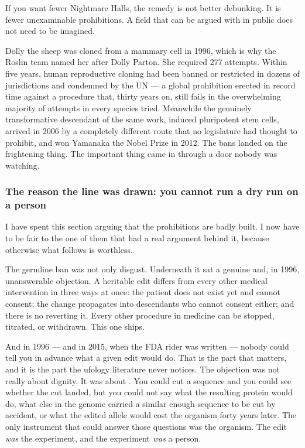 If you want fewer Nightmare Halls, the remedy is not better debunking. It is fewer unexaminable
prohibitions. A field that can be argued with in public does not need to be imagined.

\begin{funfact}
Dolly the sheep was cloned from a mammary cell in 1996, which is why the Roslin team named her
after Dolly Parton. She required 277 attempts. Within five years, human reproductive cloning had
been banned or restricted in dozens of jurisdictions and condemned by the UN --- a global
prohibition erected in record time against a procedure that, thirty years on, still fails in the
overwhelming majority of attempts in every species tried. Meanwhile the genuinely transformative
descendant of the same work, induced pluripotent stem cells, arrived in 2006 by a completely
different route that no legislature had thought to prohibit, and won Yamanaka the Nobel Prize in
2012. The bans landed on the frightening thing. The important thing came in through a door nobody
was watching.
\end{funfact}

\subsubsection*{The reason the line was drawn: you cannot run a dry run on a person}


I have spent this section arguing that the prohibitions are badly built. I now have to be fair to
the one of them that had a real argument behind it, because otherwise what follows is worthless.

The germline ban was not only disgust. Underneath it sat a genuine and, in 1996, unanswerable
objection. A heritable edit differs from every other medical intervention in three ways at once: the
patient does not exist yet and cannot consent; the change propagates into descendants who cannot
consent either; and there is no reverting it. Every other procedure in medicine can be stopped,
titrated, or withdrawn. This one ships.

And in 1996 --- and in 2015, when the FDA rider was written --- nobody could tell you in advance what
a given edit would do. That is the part that matters, and it is the part the ufology literature never
notices. The objection was not really about dignity. It was about . You could cut a
sequence and you could see whether the cut landed, but you could not say what the resulting protein
would do, what else in the genome carried a similar enough sequence to be cut by accident, or what
the edited allele would cost the organism forty years later. The only instrument that could answer
those questions was the organism. The edit \emph{was} the experiment, and the experiment \emph{was}
a person.

